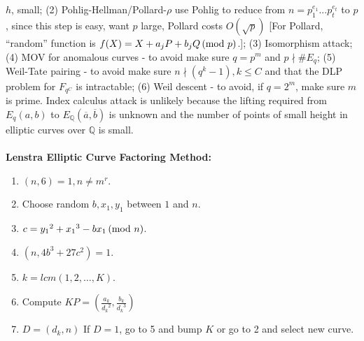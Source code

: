$h$, small; (2) Pohlig-Hellman/Pollard-$\rho$ 
use Pohlig to reduce from $n= p_1^{e_1} ... p_t^{e_t}$ to
$p$, since this step is easy, want $p$ large, Pollard costs $O({\sqrt p})$
[For Pollard, ``random'' function is $f(X)= X+ a_j P +b_j Q \thinspace \textnormal{(mod } p \textnormal{)}$.];
(3) Isomorphism attack;
(4) MOV for anomalous curves - to avoid make sure $q=p^m$ and $p \nmid \#E_q$; 
(5) Weil-Tate pairing - to avoid make sure $n \nmid (q^k-1), k \le C$ and that the
DLP problem for $F_{q^C}$ is intractable;
(6) Weil descent - to avoid, if $q=2^m$, make sure $m$ is prime.  Index calculus attack
is unlikely because the lifting required from $E_q(a,b)$ to 
$E_{\mathbb Q} ({\overline a}, {\overline b})$ is unknown and the number of points of
small height in elliptic curves over ${\mathbb Q}$ is small.
\\
\\
{\bf Lenstra Elliptic Curve Factoring Method:}
\begin{enumerate}
\item $(n,6)= 1, n \ne m^r$.
\item Choose random $b, x_1, y_1$ between $1$ and $n$.
\item $c= {y_1}^2+{x_1}^3-bx_1 \thinspace \textnormal{(mod } n \textnormal{)}$.
\item $(n, 4b^3+27c^2)= 1$.
\item $k= lcm(1,2, \ldots, K)$.
\item Compute $KP= ({\frac {a_k} {{d_k}^2}}, {\frac {b_k} {{{d_k}^3}}})$
\item $D= (d_k , n)$ If $D=1$, go to 5 and bump $K$ or go to 2 and select new curve.
\end{enumerate}
